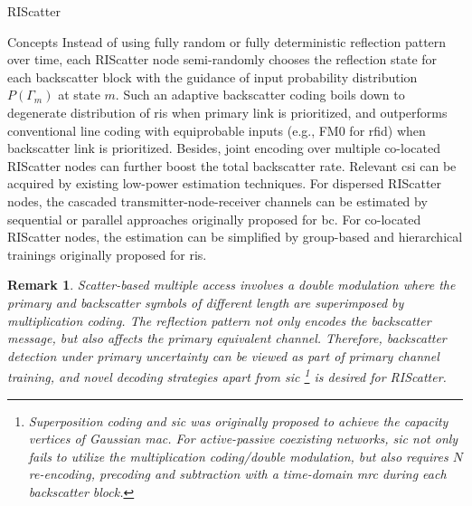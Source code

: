 \documentclass[journal]{IEEEtran}
\newtheorem{remark}{Remark}
\begin{document}
\begin{section}{RIScatter}
\begin{subsection}{Concepts}
		Instead of using fully random or fully deterministic reflection pattern over time, each RIScatter node semi-randomly chooses the reflection state for each backscatter block with the guidance of input probability distribution $P(\Gamma_m)$ at state $m$.
		Such an adaptive backscatter coding boils down to degenerate distribution of \gls{ris} when primary link is prioritized, and outperforms conventional line coding with equiprobable inputs (e.g., FM0 for \gls{rfid}) when backscatter link is prioritized.
		Besides, joint encoding over multiple co-located RIScatter nodes can further boost the total backscatter rate.
		Relevant \gls{csi} can be acquired by existing low-power estimation techniques.
		For dispersed RIScatter nodes, the cascaded transmitter-node-receiver channels can be estimated by sequential \cite{Bharadia2015,Yang2015b,Guo2019g} or parallel approaches \cite{Jin2021a} originally proposed for \gls{bc}.
		For co-located RIScatter nodes, the estimation can be simplified by group-based \cite{Zheng2019} and hierarchical \cite{You2019} trainings originally proposed for \gls{ris}.

		\begin{remark}
			Scatter-based multiple access involves a double modulation where the primary and backscatter symbols of different length are superimposed by multiplication coding.
			The reflection pattern not only encodes the backscatter message, but also affects the primary equivalent channel.
			Therefore, backscatter detection under primary uncertainty can be viewed as part of primary channel training, and novel decoding strategies apart from \gls{sic}
			\footnote{
				Superposition coding and \gls{sic} was originally proposed to achieve the capacity vertices of Gaussian \gls{mac}.
				For active-passive coexisting networks, \gls{sic} not only fails to utilize the multiplication coding/double modulation, but also requires $N$ re-encoding, precoding and subtraction with a time-domain \gls{mrc} during each backscatter block.
			}
			is desired for RIScatter.
		\end{remark}


\end{subsection}
\end{section}
\end{document}

